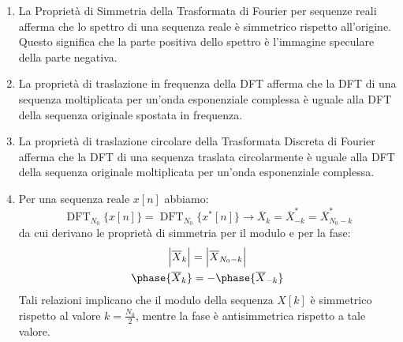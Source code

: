 \documentclass[
]{article}
\begin{document}
\begin{enumerate}
\item
  La Proprietà di Simmetria della Trasformata di Fourier per sequenze
  reali afferma che lo spettro di una sequenza reale è simmetrico
  rispetto all'origine. Questo significa che la parte positiva dello
  spettro è l'immagine speculare della parte negativa.
\item
  La proprietà di traslazione in frequenza della DFT afferma che la DFT
  di una sequenza moltiplicata per un'onda esponenziale complessa è
  uguale alla DFT della sequenza originale spostata in frequenza.
\item
  La proprietà di traslazione circolare della Trasformata Discreta di
  Fourier afferma che la DFT di una sequenza traslata circolarmente è
  uguale alla DFT della sequenza originale moltiplicata per un'onda
  esponenziale complessa.
\item
  Per una sequenza reale \(x[n]\) abbiamo: \[
  \operatorname{DFT}_{N_0}\Big\{ x[n] \Big\} = \operatorname{DFT}_{N_0}\Big\{x^{*}[n] \Big\} \to \overline{X}_k = \overline{X}^{*}_{-k} = \overline{X}^{*}_{N_0 -k}
  \] da cui derivano le proprietà di simmetria per il modulo e per la
  fase: \begin{gather*}
  \Big|\overline{X}_k \Big| = \Big| \overline{X}_{N_0 - k} \Big| \\
  \phase{\overline{X}_k} = -\phase{\overline{X}_{-k}}
  \end{gather*} Tali relazioni implicano che il modulo della sequenza
  \(X[k]\) è simmetrico rispetto al valore \(k = \frac{N_0}{2}\), mentre
  la fase è antisimmetrica rispetto a tale valore.


\end{enumerate}
\end{document}
